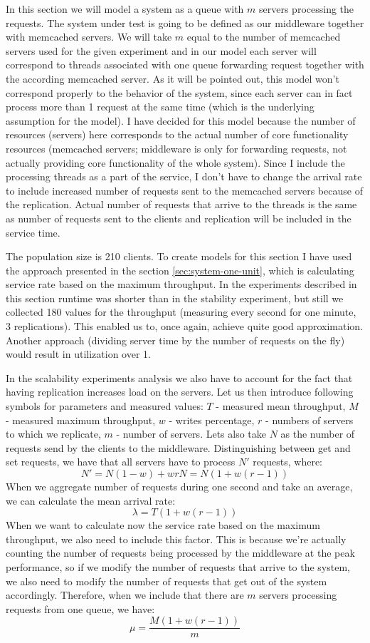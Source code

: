 \documentclass[11pt]{article}
\begin{document}
In this section we will model a system as a queue with $m$ servers processing the requests. The system under test is going to be defined as our middleware together with memcached servers. We will take $m$ equal to the number of memcached servers used for the given experiment and in our model each server will correspond to threads associated with one queue forwarding request together with the according memcached server. As it will be pointed out, this model won't correspond properly to the behavior of the system, since each server can in fact process more than 1 request at the same time (which is the underlying assumption for the model). I have decided for this model because the number of resources (servers) here corresponds to the actual number of core functionality resources (memcached servers; middleware is only for forwarding requests, not actually providing core functionality of the whole system). Since I include the processing threads as a part of the service, I don't have to change the arrival rate to include increased number of requests sent to the memcached servers because of the replication. Actual number of requests that arrive to the threads is the same as number of requests sent to the clients and replication will be included in the service time.

The population size is 210 clients. To create models for this section I have used the approach presented in the section \ref{sec:system-one-unit}, which is calculating service rate based on the maximum throughput. In the experiments described in this section runtime was shorter than in the stability experiment, but still we collected 180 values for the throughput (measuring every second for one minute, 3 replications). This enabled us to, once again, achieve quite good approximation. Another approach (dividing server time by the number of requests on the fly) would result in utilization over 1.

\iffalse
In the scalability experiments analysis we also have to account for the fact that having replication increases load on the servers. Let us then introduce following symbols for parameters and measured values: $T$ - measured mean throughput, $M$ - measured maximum throughput, $w$ - writes percentage, $r$ - numbers of servers to which we replicate, $m$ - number of servers. Lets also take $N$ as the number of requests send by the clients to the middleware. Distinguishing between get and set requests, we have that all servers have to process $N'$ requests, where:
$$N' = N (1 - w) + wrN = N (1 + w(r - 1))$$
When we aggregate number of requests during one second and take an average, we can calculate the mean arrival rate:
$$\lambda = T (1 + w(r - 1))$$
When we want to calculate now the service rate based on the maximum throughput, we also need to include this factor. This is because we're actually counting the number of requests being processed by the middleware at the peak performance, so if we modify the number of requests that arrive to the system, we also need to modify the number of requests that get out of the system accordingly. Therefore, when we include that there are $m$ servers processing requests from one queue, we have:
$$\mu = \frac{M  (1 + w(r - 1))}{m}$$
\end{document}
